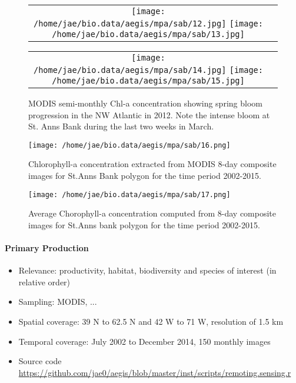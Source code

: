 \documentclass[letterpaper,portrait,11pt]{scrartcl}
\numberwithin{equation}{section}    %
\numberwithin{figure}{section}    %
\numberwithin{table}{section}       %
\begin{document}
\begin{figure}[ht]

  \centering
  \begin{tabular}{cc}
    \texttt{[image: /home/jae/bio.data/aegis/mpa/sab/12.jpg]}
    \texttt{[image: /home/jae/bio.data/aegis/mpa/sab/13.jpg]}
  \end{tabular}
  \begin{tabular}{cc}
    \texttt{[image: /home/jae/bio.data/aegis/mpa/sab/14.jpg]}
    \texttt{[image: /home/jae/bio.data/aegis/mpa/sab/15.jpg]}
  \end{tabular}
  \caption{MODIS semi-monthly Chl-a concentration showing spring bloom progression in the NW Atlantic in 2012. Note the intense bloom at St. Anns Bank during the last two weeks in March.}
  \label{fig:MapChlaBloomSpring}
\end{figure}


\begin{figure}[h]

  \centering
  \texttt{[image: /home/jae/bio.data/aegis/mpa/sab/16.png]}
  \caption{Chlorophyll-a concentration extracted from MODIS 8-day composite images for St.Anns Bank polygon for the time period 2002-2015.}
  \label{fig:modisChlaTS}
\end{figure}


\begin{figure}[h]

  \centering
  \texttt{[image: /home/jae/bio.data/aegis/mpa/sab/17.png]}
  \caption {Average Chorophyll-a concentration computed from 8-day composite images for St.Anns bank polygon for the time period 2002-2015. }
  \label{fig:ChlaSeasonal}
\end{figure}



\afterpage{\clearpage}
\paragraph{Primary Production}

\begin{itemize}
  \item Relevance:  productivity, habitat, biodiversity and species of interest (in relative order)
  \item Sampling:  MODIS, ...
  \item Spatial coverage: 39 N to 62.5 N and 42 W to 71 W, resolution of 1.5 km
  \item Temporal coverage: July 2002 to December 2014, 150 monthly  images
  \item Source code \url{https://github.com/jae0/aegis/blob/master/inst/scripts/remoting.sensing.r}
\end{itemize}
\end{document}
